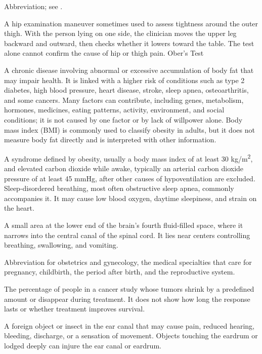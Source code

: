  Abbreviation; see .

 A hip examination maneuver sometimes used to assess tightness around the outer thigh. With the person lying on one side, the clinician moves the upper leg backward and outward, then checks whether it lowers toward the table. The test alone cannot confirm the cause of hip or thigh pain.
\synonyms
Ober's Test

 A chronic disease involving abnormal or excessive accumulation of body fat that may impair health. It is linked with a higher risk of conditions such as type 2 diabetes, high blood pressure, heart disease, stroke, sleep apnea, osteoarthritis, and some cancers. Many factors can contribute, including genes, metabolism, hormones, medicines, eating patterns, activity, environment, and social conditions; it is not caused by one factor or by lack of willpower alone. Body mass index (BMI) is commonly used to classify obesity in adults, but it does not measure body fat directly and is interpreted with other information.

 A syndrome defined by obesity, usually a body mass index of at least 30 kg/m\textsuperscript{2},
and elevated carbon dioxide while awake, typically an arterial carbon dioxide pressure of at least 45 mmHg,
after other causes of hypoventilation are excluded. Sleep-disordered breathing, most often obstructive sleep apnea,
commonly accompanies it. It may cause low blood oxygen, daytime sleepiness, and strain on the heart.

 A small area at the lower end of the brain’s fourth fluid-filled space, where it narrows into the central canal of the spinal cord. It lies near centers controlling breathing, swallowing, and vomiting.

 Abbreviation for obstetrics and gynecology, the medical specialties that care for pregnancy, childbirth, the period after birth, and the reproductive system.

 The percentage of people in a cancer study whose tumors shrink by a predefined amount or disappear during treatment. It does not show how long the response lasts or whether treatment improves survival.

 A foreign object or insect in the ear canal that may cause pain, reduced hearing, bleeding, discharge, or a sensation of movement. Objects touching the eardrum or lodged deeply can injure the ear canal or eardrum.

